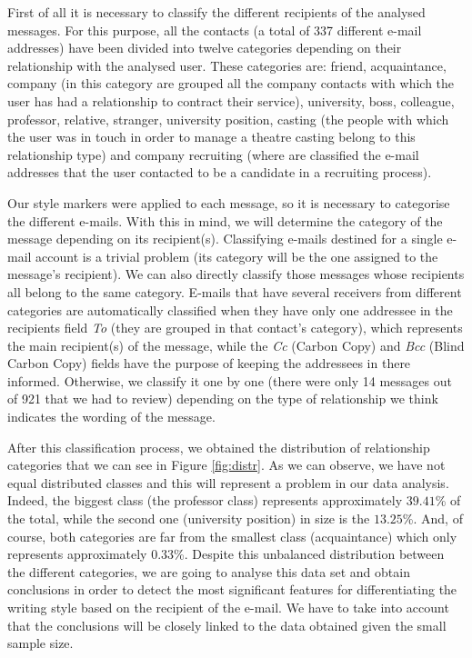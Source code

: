 First of all it is necessary to classify the different recipients of the analysed messages. For this purpose, all the contacts (a total of 337 different e-mail addresses) have been divided into twelve categories depending on their relationship with the analysed user. These categories are: friend, acquaintance, company (in this category are grouped all the company contacts with which the user has had a relationship to contract their service), university, boss, colleague, professor, relative, stranger, university position, casting (the people with which the user was in touch in order to manage a theatre casting belong to this relationship type) and company recruiting (where are classified the e-mail addresses that the user contacted to be a candidate in a recruiting process).

Our style markers were applied to each message, so it is necessary to categorise the different e-mails. With this in mind, we will determine the category of the message depending on its recipient(s). Classifying e-mails destined for a single e-mail account is a trivial problem (its category will be the one assigned to the message's recipient). We can also directly classify those messages whose recipients all belong to the same category. E-mails that have several receivers from different categories are automatically classified when they have only one addressee in the recipients field \textit{To} (they are grouped in that contact's category), which represents the main recipient(s) of the message, while the \textit{Cc} (Carbon Copy) and \textit{Bcc} (Blind Carbon Copy) fields have the purpose of keeping the addressees in there informed. Otherwise, we classify it one by one (there were only 14 messages out of 921 that we had to review) depending on the type of relationship we think indicates the wording of the message.

After this classification process, we obtained the distribution of relationship categories that we can see in Figure \ref{fig:distr}. As we can observe, we have not equal distributed classes and this will represent a problem in our data analysis. Indeed, the biggest class (the professor class) represents approximately $39.41$\% of the total, while the second one (university position) in size is the $13.25$\%. And, of course, both categories are far from the smallest class (acquaintance) which only represents approximately $0.33$\%. Despite this unbalanced distribution between the different categories, we are going to analyse this data set and obtain conclusions in order to detect the most significant features for differentiating the writing style based on the recipient of the e-mail. We have to take into account that the conclusions will be closely linked to the data obtained given the small sample size.

